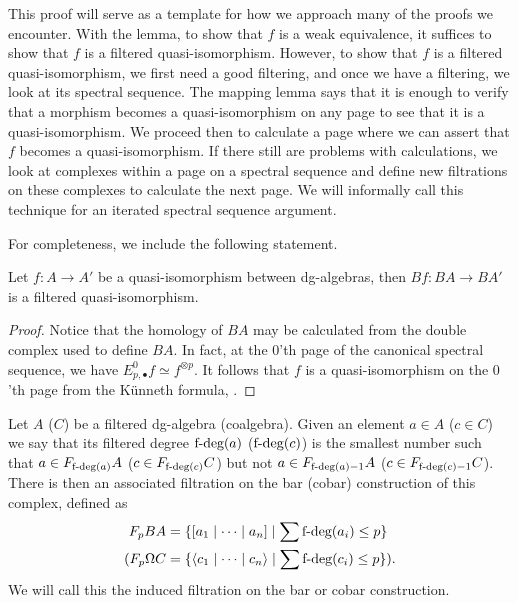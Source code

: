 \documentclass[../thesis.tex]{subfiles}
\begin{document}
            This proof will serve as a template for how we approach many of the proofs we encounter. With the lemma, to show that $f$ is a weak equivalence, it suffices to show that $f$ is a filtered quasi-isomorphism. However, to show that $f$ is a filtered quasi-isomorphism, we first need a good filtering, and once we have a filtering, we look at its spectral sequence. The mapping lemma says that it is enough to verify that a morphism becomes a quasi-isomorphism on any page to see that it is a quasi-isomorphism. We proceed then to calculate a page where we can assert that $f$ becomes a quasi-isomorphism. If there still are problems with calculations, we look at complexes within a page on a spectral sequence and define new filtrations on these complexes to calculate the next page. We will informally call this technique for an iterated spectral sequence argument.

            For completeness, we include the following statement.

            \begin{lemma}
                Let $f: A \rightarrow A'$ be a quasi-isomorphism between dg-algebras, then $Bf: BA \rightarrow BA'$ is a filtered quasi-isomorphism.
            \end{lemma}

            \begin{proof}
                Notice that the homology of $BA$ may be calculated from the double complex used to define $BA$. In fact, at the $0$'th page of the canonical spectral sequence, we have $E^0_{p, \bullet}f \simeq f^{\otimes p}$. It follows that $f$ is a quasi-isomorphism on the $0$'th page from the K\"unneth formula, \cite[Theorem 3.6.3][88]{Weibel94}.            
            \end{proof}

            Let $A$ ($C$) be a filtered dg-algebra (coalgebra). Given an element $a\in A$ ($c\in C$) we say that its filtered degree $\tt{f-deg}(a)$ ($\tt{f-deg}(c)$) is the smallest number such that $a\in F_{\tt{f-deg}(a)}A$ ($c\in F_{\tt{f-deg}(c)}C$) but not $a\in F_{\tt{f-deg}(a)-1}A$ ($c\in F_{\tt{f-deg}(c)-1}C$). There is then an associated filtration on the bar (cobar) construction of this complex, defined as 
            \begin{align*}
                F_pBA & = \startset{[ a_1 \mid \cdots \mid a_n ] \mid \sum \tt{f-deg}(a_i)\leq p} \\
                (F_p\Omega C & = \startset{\langle c_1 \mid \cdots \mid c_n \rangle \mid \sum \tt{f-deg}(c_i) \leq p})\tt{.}
            \end{align*}
            We will call this the induced filtration on the bar or cobar construction.
\end{document}
